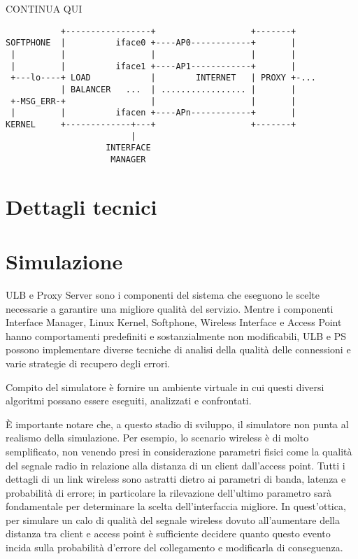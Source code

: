 \documentclass[12pt,a4paper,openright,twoside]{book}
\begin{document}
CONTINUA QUI

\begin{verbatim}
           +-----------------+                   +-------+
SOFTPHONE  |          iface0 +----AP0------------+       |
 |         |                 |                   |       |
 |         |          iface1 +----AP1------------+       |
 +---lo----+ LOAD            |        INTERNET   | PROXY +-...
           | BALANCER   ...  | ................. |       |
 +-MSG_ERR-+                 |                   |       |
 |         |          ifacen +----APn------------+       |
KERNEL     +-------------+---+                   +-------+
                         |
                    INTERFACE
                     MANAGER
\end{verbatim}

\chapter{Dettagli tecnici}


\chapter{Simulazione}
ULB e Proxy Server sono i componenti del sistema che eseguono le
scelte necessarie a garantire una migliore qualità del
servizio. Mentre i componenti Interface Manager, Linux Kernel,
Softphone, Wireless Interface e Access Point hanno comportamenti
predefiniti e sostanzialmente non modificabili, ULB e PS possono
implementare  diverse tecniche di analisi della qualità delle
connessioni e varie strategie di recupero degli errori.

Compito del simulatore è fornire un ambiente virtuale in cui questi
diversi algoritmi possano essere eseguiti, analizzati e confrontati.

È importante notare che, a questo stadio di sviluppo, il simulatore
non punta al realismo della simulazione. Per esempio, lo scenario
wireless è di molto semplificato, non venendo presi in considerazione
parametri fisici come la qualità del segnale radio in relazione alla
distanza di un client dall'access point. Tutti i dettagli di un link
wireless sono astratti dietro ai parametri di banda, latenza e
probabilità di errore; in particolare la rilevazione dell'ultimo
parametro sarà fondamentale per determinare la scelta dell'interfaccia
migliore. In quest'ottica, per simulare un calo di qualità del segnale
wireless dovuto all'aumentare della distanza tra client e access point
è sufficiente decidere quanto questo evento incida sulla probabilità
d'errore del collegamento e modificarla di conseguenza.
\end{document}

